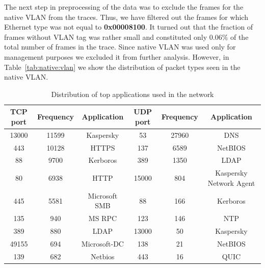 The next step in preprocessing of the data was to exclude the frames 
for the native VLAN from the traces. Thus, we have filtered out 
the frames for which Ethernet type was not equal to {\bf 0x00008100}.
It turned out that the fraction of frames without VLAN tag was rather 
small and constituted only $0.06 \%$ of the total number of frames in 
the trace. Since native VLAN was used only for management purposes
we excluded it from further analysis. However, in Table~\ref{tab:native:vlan} we show 
the  distribution of packet types seen in the native VLAN.

\begin{table}[h!]
  \caption{Distribution of top applications used in the network}
  \label{tab:apps}
  \centering
  \begin{tabular}{cccccc}
    \hline
    {\bf TCP port} & {\bf Frequency } & {\bf Application} & {\bf UDP port} & {\bf Frequency} & {\bf Application}       \\
    \hline
         13000     & 11599            &  Kaspersky        &        53      &      27960      & DNS                     \\
         443       & 10128            &  HTTPS            &        137     &      6589       & NetBIOS                 \\
          88       & 9700             &  Kerboros         &       389      &      1350       & LDAP                    \\
          80       & 6938             &  HTTP             &     15000      &      804        & Kaspersky Network Agent \\
          445      & 5581             &  Microsoft SMB    &        88      &      166        & Kerboros                \\
          135      & 940              &  MS RPC           &       123      &      146        & NTP                     \\
          389      & 880              &  LDAP             &      13000     &      50         & Kaspersky               \\
          49155    & 694              &  Microsoft-DC     &      138       &      21         & NetBIOS                 \\
          139      & 682              &  Netbios          &      443       &      16         & QUIC                    \\
    \hline
  \end{tabular}
\end{table}

